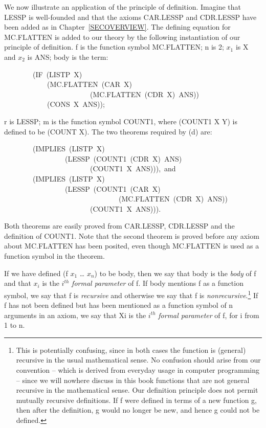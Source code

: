 \documentclass[10pt]{book}
\newenvironment{pubasis}{\begin{flushleft}}{\end{flushleft}}
\begin{document}
We now illustrate an application of the principle of definition.
Imagine that LESSP is well-founded and that the axioms CAR.LESSP
and CDR.LESSP have been added as in Chapter~\ref{SECOVERVIEW}.
The defining equation for MC.FLATTEN is added to our theory
by the following instantiation of our principle of definition.
f is the function symbol MC.FLATTEN; n is 2; $x_{1}$ is X and
$x_{2}$ is ANS; body is the term:
\begin{pubasis}
~~~~~~~~(IF~(LISTP~X)\\
~~~~~~~~~~~~(MC.FLATTEN~(CAR~X)\\
~~~~~~~~~~~~~~~~~~~~~~~~(MC.FLATTEN~(CDR~X)~ANS))\\
~~~~~~~~~~~~(CONS~X~ANS));\\
\end{pubasis}
r is LESSP; m is the function symbol COUNT1, where (COUNT1 X Y)
is defined to be (COUNT X).  The two theorems required by (d) are:
\begin{pubasis}
~~~~~~~~(IMPLIES~(LISTP~X)\\
~~~~~~~~~~~~~~~~~(LESSP~(COUNT1~(CDR~X)~ANS)\\
~~~~~~~~~~~~~~~~~~~~~~~~(COUNT1~X~ANS))),~and\\

~~~~~~~~(IMPLIES~(LISTP~X)\\
~~~~~~~~~~~~~~~~~(LESSP~(COUNT1~(CAR~X)\\
~~~~~~~~~~~~~~~~~~~~~~~~~~~~~~~~(MC.FLATTEN~(CDR~X)~ANS))\\
~~~~~~~~~~~~~~~~~~~~~~~~(COUNT1~X~ANS))).\\
\end{pubasis}
Both theorems are easily proved from CAR.LESSP, CDR.LESSP and the
definition of COUNT1.  Note that the second theorem is
proved before any axiom about MC.FLATTEN has been posited,
even though MC.FLATTEN is used as a function symbol in the theorem.

If we have defined (f $x_{1}$ \ldots{} $x_{n}$) to be body, then
we say that body is the \emph{body} of f and that $x_{i}$ is
the $i^{th}$ \emph{formal parameter} of f.  If body mentions
f as a function symbol, we say that f is \emph{recursive}
and otherwise we say that f is \emph{nonrecursive}.\footnote{This is potentially confusing, since in both cases the function is (general) recursive in the usual mathematical sense.  No confusion should arise from our convention -- which is derived from everyday usage in computer programming -- since we will nowhere discuss in this book functions that are not general recursive in the mathematical sense.  Our definition principle does not permit mutually recursive definitions.  If f were defined in terms of a new function g, then after the definition, g would no longer be new, and hence g could not be defined.}
If f has not been defined but has been mentioned as a function
symbol of n arguments in an axiom, we say that Xi is the
$i^{th}$ \emph{formal parameter} of f, for i from 1 to n.
\end{document}
